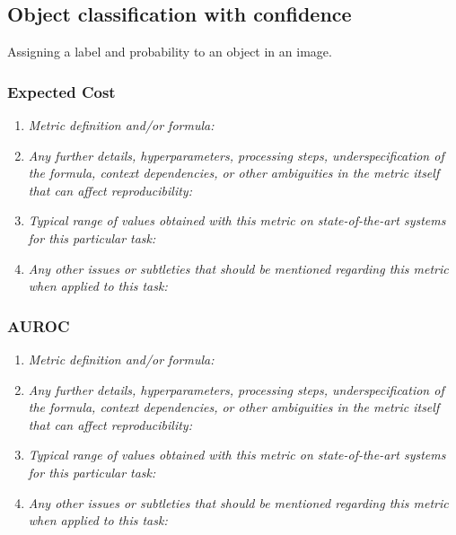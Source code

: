 \documentclass[a4paper,11pt]{article}
\begin{document}
    \subsection{Object classification with confidence}
        Assigning a label and probability to an object in an image.
        \subsubsection{Expected Cost}
            \begin{enumerate}[label=\alph*.]
                \item \textit{Metric definition and/or formula:}
                \bigskip
                \item \textit{Any further details, hyperparameters, processing steps, underspecification of the formula, context dependencies, or other ambiguities in the metric itself that can affect reproducibility:}
                \bigskip
                \item \textit{Typical range of values obtained with this metric on state-of-the-art systems for this particular task:}
                \bigskip
                \item \textit{Any other issues or subtleties that should be mentioned regarding this metric when applied to this task:}
                \bigskip
            \end{enumerate}
        \subsubsection{AUROC}
            \begin{enumerate}[label=\alph*.]
                \item \textit{Metric definition and/or formula:}
                \bigskip
                \item \textit{Any further details, hyperparameters, processing steps, underspecification of the formula, context dependencies, or other ambiguities in the metric itself that can affect reproducibility:}
                \bigskip
                \item \textit{Typical range of values obtained with this metric on state-of-the-art systems for this particular task:}
                \bigskip
                \item \textit{Any other issues or subtleties that should be mentioned regarding this metric when applied to this task:}
                \bigskip
            \end{enumerate}
\end{document}
